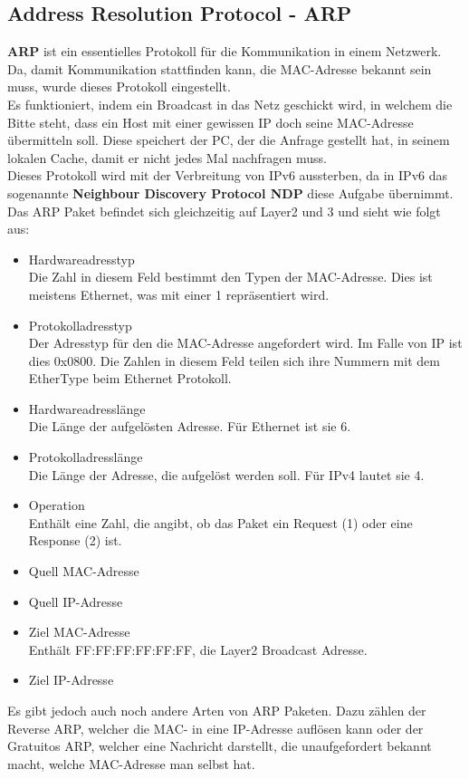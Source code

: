 \documentclass[12pt,a4paper]{report}
\begin{document}
\begin{onehalfspace}
\subsection{Address Resolution Protocol - ARP}\label{ssec:arp}
\textbf{ARP} ist ein essentielles Protokoll für die Kommunikation in einem Netzwerk. Da, damit Kommunikation stattfinden kann, die MAC-Adresse bekannt sein muss, wurde dieses Protokoll eingestellt.\\
Es funktioniert, indem ein Broadcast in das Netz geschickt wird, in welchem die Bitte steht, dass ein Host mit einer gewissen IP doch seine MAC-Adresse übermitteln soll. Diese speichert der PC, der die Anfrage gestellt hat, in seinem lokalen Cache, damit er nicht jedes Mal nachfragen muss.\\
Dieses Protokoll wird mit der Verbreitung von IPv6 aussterben, da in IPv6 das sogenannte \textbf{Neighbour Discovery Protocol NDP} diese Aufgabe übernimmt.\\

Das ARP Paket befindet sich gleichzeitig auf Layer2 und 3 und sieht wie folgt aus:\\
\begin{itemize}
\item Hardwareadresstyp\\
Die Zahl in diesem Feld bestimmt den Typen der MAC-Adresse. Dies ist meistens Ethernet, was mit einer 1 repräsentiert wird.
\item Protokolladresstyp\\
Der Adresstyp für den die MAC-Adresse angefordert wird. Im Falle von IP ist dies 0x0800. Die Zahlen in diesem Feld teilen sich ihre Nummern mit dem EtherType beim Ethernet Protokoll.
\item Hardwareadresslänge\\
Die Länge der aufgelösten Adresse. Für Ethernet ist sie 6.
\item Protokolladresslänge\\
Die Länge der Adresse, die aufgelöst werden soll. Für IPv4 lautet sie 4.
\item Operation\\
Enthält eine Zahl, die angibt, ob das Paket ein Request (1) oder eine Response (2) ist.
\item Quell MAC-Adresse
\item Quell IP-Adresse
\item Ziel MAC-Adresse\\
Enthält FF:FF:FF:FF:FF:FF, die Layer2 Broadcast Adresse.
\item Ziel IP-Adresse
\end{itemize}
Es gibt jedoch auch noch andere Arten von ARP Paketen. Dazu zählen der Reverse ARP, welcher die MAC- in eine IP-Adresse auflösen kann oder der Gratuitos ARP, welcher eine Nachricht darstellt, die unaufgefordert bekannt macht, welche MAC-Adresse man selbst hat.

\end{onehalfspace}
\end{document}
